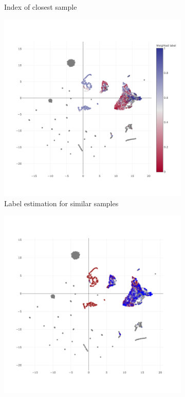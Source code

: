 \documentclass{article}
\begin{document}
\begin{figure}
\begin{subfigure}{.32\textwidth}
        \caption{Index of closest sample}
        \label{fig:alg-closest}
    \end{subfigure}
    \begin{subfigure}{.32\textwidth}
        \centering
        \includegraphics[width=\linewidth]{img/embedding_weighted_label.png}
        \caption{Label estimation for similar samples}
        \label{fig:alg-weighted}
    \end{subfigure}
    \begin{subfigure}{.32\textwidth}
        \centering
        \includegraphics[width=\linewidth]{img/embedding_confident.png}

\end{subfigure}
\end{figure}
\end{document}
